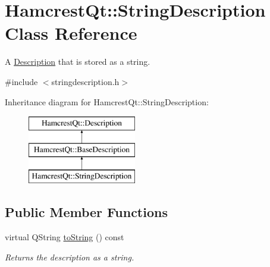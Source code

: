 \hypertarget{class_hamcrest_qt_1_1_string_description}{\section{Hamcrest\-Qt\-:\-:String\-Description Class Reference}
\label{class_hamcrest_qt_1_1_string_description}
}


A \hyperlink{class_hamcrest_qt_1_1_description}{Description} that is stored as a string.  




{\ttfamily \#include $<$stringdescription.\-h$>$}

Inheritance diagram for Hamcrest\-Qt\-:\-:String\-Description\-:\begin{figure}[H]
\begin{center}
\leavevmode
\includegraphics[height=3.000000cm]{class_hamcrest_qt_1_1_string_description}
\end{center}
\end{figure}
\subsection*{Public Member Functions}
\begin{DoxyCompactItemize}
\item 
\hypertarget{class_hamcrest_qt_1_1_string_description_a7e5471e0482e2c026af2d37e5c155e67}{virtual Q\-String \hyperlink{class_hamcrest_qt_1_1_string_description_a7e5471e0482e2c026af2d37e5c155e67}{to\-String} () const }\label{class_hamcrest_qt_1_1_string_description_a7e5471e0482e2c026af2d37e5c155e67}

\begin{DoxyCompactList}\small\item\em Returns the description as a string. \end{DoxyCompactList}\end{DoxyCompactItemize}
